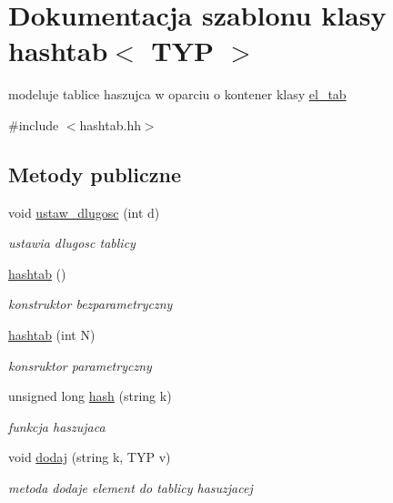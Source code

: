 \hypertarget{classhashtab}{\section{\-Dokumentacja szablonu klasy hashtab$<$ \-T\-Y\-P $>$}
\label{classhashtab}
}


modeluje tablice haszujca w oparciu o kontener klasy \hyperlink{classel__tab}{el\-\_\-tab}  




{\ttfamily \#include $<$hashtab.\-hh$>$}

\subsection*{\-Metody publiczne}
\begin{DoxyCompactItemize}
\item 
void \hyperlink{classhashtab_a94671e2fe307f5248c0b1b6855d4c3d4}{ustaw\-\_\-dlugosc} (int d)
\begin{DoxyCompactList}\small\item\em ustawia dlugosc tablicy \end{DoxyCompactList}\item 
\hyperlink{classhashtab_abcac01cb8d855d39b9d766a6f16856ee}{hashtab} ()
\begin{DoxyCompactList}\small\item\em konstruktor bezparametryczny \end{DoxyCompactList}\item 
\hyperlink{classhashtab_aa7315b45b8b2251113cc6d9c8d606bb8}{hashtab} (int \-N)
\begin{DoxyCompactList}\small\item\em konsruktor parametryczny \end{DoxyCompactList}\item 
unsigned long \hyperlink{classhashtab_ad52a5a127bcfe2b93bbec7fe702f10a6}{hash} (string k)
\begin{DoxyCompactList}\small\item\em funkcja haszujaca \end{DoxyCompactList}\item 
void \hyperlink{classhashtab_ad25515f0b7a631904c65b57f834c428f}{dodaj} (string k, \-T\-Y\-P v)
\begin{DoxyCompactList}\small\item\em metoda dodaje element do tablicy hasuzjacej \end{DoxyCompactList}\item 

\end{DoxyCompactItemize}

